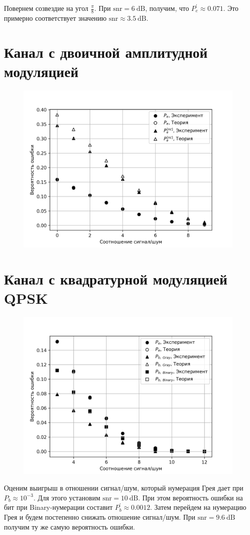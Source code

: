 \documentclass[14pt, a4paper]{article}
\begin{document}
Повернем созвездие на угол $\frac{\pi}{8}$. При $\text{snr}=6\ \text{dB}$, получим, что $P_e^\prime\approx0.071$. Это примерно соответствует значению $\text{snr}\approx3.5\ \text{dB}$.

\section{Канал с двоичной амплитудной модуляцией}

\begin{figure}[H]
\centering
\includegraphics[width=.6\linewidth]{../images/rt2-3}
\end{figure}

\section{Канал с квадратурной модуляцией QPSK}

\begin{figure}[H]
\centering
\includegraphics[width=.6\linewidth]{../images/rt2-4}
\end{figure}

Оценим выигрыш в отношении сигнал/шум, который нумерация Грея дает при $P_b\approx10^{-3}$. Для этого установим  $\text{snr}=10\ \text{dB}$. При этом вероятность ошибки на бит при Binary-нумерации составит $P_b^\prime\approx0.0012$. Затем перейдем на нумерацию Грея и будем постепенно снижать отношение сигнал/шум. При $\text{snr}=9.6\ \text{dB}$ получим ту же самую вероятность ошибки.
\end{document}
